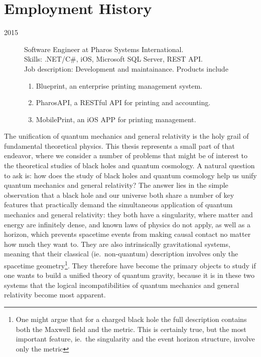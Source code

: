 \documentclass{brownthesis}
\begin{document}
\section*{Employment History}
\begin{description}
\item[2015] Software Engineer at Pharos Systems International.\\
  {Skills:} .NET/C\#, iOS, Microsoft SQL Server, REST API.\\
  {Job description:} Development and maintainance. Products include
  \begin{enumerate}
  \item Blueprint, an enterprise printing management system.
  \item PharosAPI, a RESTful API for printing and accounting.
  \item MobilePrint, an iOS APP for printing management.
  \end{enumerate}
\end{description}

The unification of quantum mechanics and general relativity is the holy grail of fundamental theoretical physics. This thesis represents a small part of that endeavor, where we consider a number of problems that might be of interest to the theoretical studies of black holes and quantum cosmology. A natural question to ask is: how does the study of black holes and quantum cosmology help us unify quantum mechanics and general relativity? The answer lies in the simple observation that a black hole and our universe both share a number of key features that practically demand the simultaneous application of quantum mechanics and general relativity: they both have a singularity, where matter and energy are infinitely dense, and known laws of physics do not apply, as well as a horizon, which prevents spacetime events from making causal contact no matter how much they want to. They are also intrinsically gravitational systems, meaning that their classical (ie.~non-quantum) description involves only the spacetime geometry\footnote{One might argue that for a charged black hole the full description contains both the Maxwell field and the metric. This is certainly true, but the most important feature, ie.~the singularity and the event horizon structure, involve only the metric}. They therefore have become the primary objects to study if one wants to build a unified theory of quantum gravity, because it is in these two systems that the logical incompatibilities of quantum mechanics and general relativity become most apparent.
\end{document}
